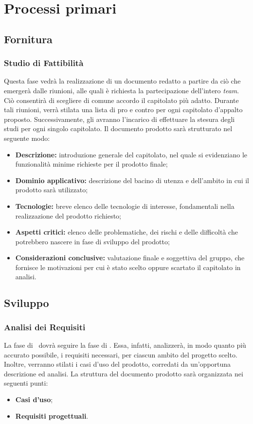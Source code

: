 \newpage
\section{Processi primari}

	\subsection{Fornitura}
		\subsubsection{Studio di Fattibilità}
		Questa fase vedrà la realizzazione di un documento redatto a partire da ciò che emergerà dalle riunioni, alle quali è richiesta la partecipazione dell'intero \textit{team}. Ciò consentirà di scegliere di comune accordo il capitolato più adatto. Durante tali riunioni, verrà stilata una lista di pro e contro per ogni capitolato d'appalto proposto. Successivamente, gli \textit{\Anas} avranno l'incarico di effettuare la stesura degli studi per ogni singolo capitolato. Il documento prodotto sarà strutturato nel seguente modo:
		\begin{itemize}
		\item \textbf{Descrizione:} introduzione generale del capitolato, nel quale si evidenziano le funzionalità minime richieste per il prodotto finale;
		\item \textbf{Dominio applicativo:} descrizione del bacino di utenza e dell'ambito in cui il prodotto sarà utilizzato;
		\item \textbf{Tecnologie:} breve elenco delle tecnologie di interesse, fondamentali nella realizzazione del prodotto richiesto;
		\item \textbf{Aspetti critici:} elenco delle problematiche, dei rischi e delle difficoltà che potrebbero nascere in fase di sviluppo del prodotto;
		\item \textbf{Considerazioni conclusive:} valutazione finale e soggettiva del gruppo, che fornisce le motivazioni per cui è stato scelto oppure scartato il capitolato in analisi.
		\end{itemize}

	\subsection{Sviluppo}
	
		\subsubsection{Analisi dei Requisiti}
		La fase di \AdR\ dovrà seguire la fase di \SdF. Essa, infatti, analizzerà, in modo quanto più accurato possibile, i requisiti necessari, per ciascun ambito del progetto scelto. Inoltre, verranno stilati i casi d'uso del prodotto, corredati da un'opportuna descrizione ed analisi. La struttura del documento prodotto sarà organizzata nei seguenti punti:
		\begin{itemize}
			\item \textbf{Casi d'uso};
			\item \textbf{Requisiti progettuali}.
		\end{itemize}
		
